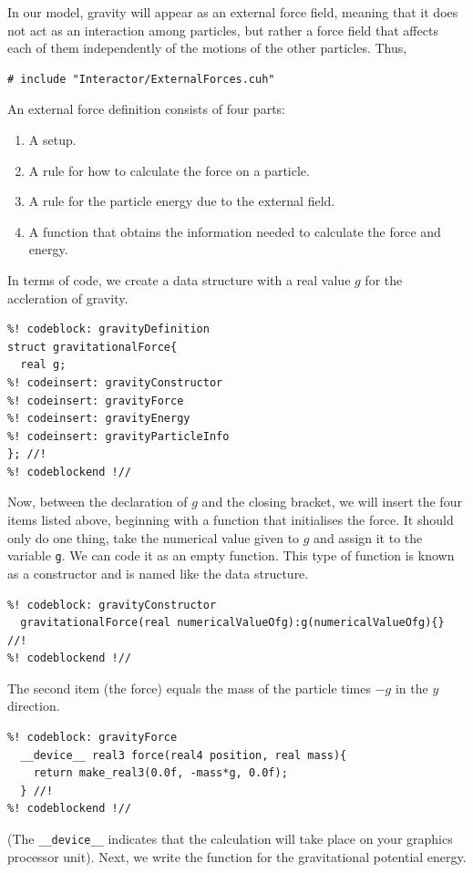 In our model, gravity will appear as an external force field, meaning that it
does not act as an interaction among particles, but rather a force field that
affects each of them independently of the motions of the other particles. Thus,
\begin{lstlisting}
# include "Interactor/ExternalForces.cuh"
\end{lstlisting}

An external force definition consists of four parts:
\begin{enumerate}
  \item A setup.
  \item A rule for how to calculate the force on a particle.
  \item A rule for the particle energy due to the external field.
  \item A function that obtains the information needed to calculate the force
        and energy.
\end{enumerate}
In terms of code, we create a data structure with a real value $g$ for the
accleration of gravity.
\begin{lstlisting}
%! codeblock: gravityDefinition
struct gravitationalForce{
  real g;
%! codeinsert: gravityConstructor
%! codeinsert: gravityForce
%! codeinsert: gravityEnergy
%! codeinsert: gravityParticleInfo
}; //!
%! codeblockend !//
\end{lstlisting}
Now, between the declaration of $g$ and the closing bracket, we will insert the
four items listed above, beginning with a function that initialises the force.
It should only do one thing, take the numerical value given to $g$ and assign it
to the variable \texttt{g}. We can code it as an empty function. This type of 
function is known as a constructor and is named like the data structure.
\begin{lstlisting}
%! codeblock: gravityConstructor
  gravitationalForce(real numericalValueOfg):g(numericalValueOfg){} //!
%! codeblockend !//
\end{lstlisting}
The second item (the force) equals the mass of the particle times $-g$ in the
$y$ direction.
\begin{lstlisting}
%! codeblock: gravityForce
  __device__ real3 force(real4 position, real mass){
    return make_real3(0.0f, -mass*g, 0.0f);
  } //!
%! codeblockend !//
\end{lstlisting}
(The \texttt{\_\_device\_\_} indicates that the calculation will take place on 
your graphics processor unit). Next, we write the function for the gravitational 
potential energy.
